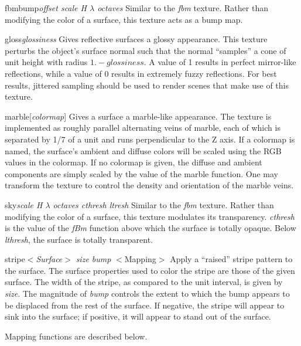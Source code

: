 \begin{defkey}{fbmbump}{{\em offset scale H $\lambda$ octaves}}
Similar to the {\em fbm} texture.  Rather than modifying the color of
a surface, this texture acts as a bump map.
\end{defkey}

\begin{defkey}{gloss}{{\em glossiness}}
Gives reflective surfaces a glossy appearance. This texture perturbs
the object's surface normal such that the normal ``samples'' a cone of
unit height with radius $1. - glossiness$.  A value of 1 results
in perfect mirror-like reflections, while a value of 0 results
in extremely fuzzy reflections.  For best results, jittered sampling
should be used to render scenes that make use of this texture.
\end{defkey}

\begin{defkey}{marble}{[{\em colormap}]}
Gives a surface a marble-like appearance.  The texture is implemented as
roughly parallel alternating veins of marble, each of which is
separated by 1/7 of a unit and runs perpendicular to the Z axis.
If a colormap is named, the surface's ambient and diffuse colors
will be scaled using the RGB values in the colormap.  If no colormap is
given, the diffuse and ambient components are simply scaled by the
value of the marble function.  One may transform the texture to
control the density and orientation of the marble veins.
\end{defkey}

\begin{defkey}{sky}{{\em scale H $\lambda$ octaves cthresh ltresh}}
	Similar to the {\em fbm} texture.  Rather than modifying the
	color of a surface, this texture modulates its transparency.
	{\em cthresh} is the value of the {\em fBm} function above
	which the surface is totally opaque.  Below {\em lthresh},
	the surface is totally transparent.
\end{defkey}

\begin{defkey}{stripe}{$<${\em Surface}$>$ {\em size bump} $<$Mapping$>$}
	Apply a ``raised'' stripe pattern to the surface.
	The surface properties used to color the stripe are those
	of the given surface.  The width of the stripe, as compared
	to the unit interval, is given by {\em size}.  The magnitude
	of {\em bump} controls the extent to which the bump appears
	to be displaced from the rest of the surface.  If negative,
	the stripe will appear to
	sink into the surface; if positive, it will appear to stand
	out of the surface.
\end{defkey}
Mapping functions are described below.


